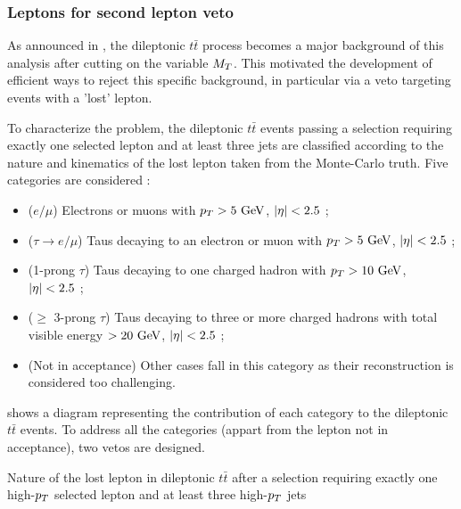         \subsubsection{Leptons for second lepton veto \label{sec:vetoLeptons}}

    As announced in , the dileptonic $t\bar{t}$
    process becomes a major background of this analysis after cutting on the variable $M_T$.
    This motivated the development of efficient ways to reject this specific background,
    in particular via a veto targeting events with a 'lost' lepton.

    To characterize the problem, the dileptonic $t\bar{t}$ events passing a selection
    requiring exactly one selected lepton and at least three jets are classified according
    to the nature and kinematics of the lost lepton taken from the Monte-Carlo truth. Five
    categories are considered :
    \begin{itemize}
        \item ($e/\mu$) Electrons or muons with $p_T > 5~\text{GeV}$, $\left| \eta \right| < 2.5$ ;
        \item ($\tau \rightarrow e/\mu$) Taus decaying to an electron or muon with $p_T > 5~\text{GeV}$, $\left| \eta \right| < 2.5$ ;
        \item (1-prong $\tau$) Taus decaying to one charged hadron with $p_T > 10~\text{GeV}$, $\left| \eta \right| < 2.5$ ;
        \item ($\geq$ 3-prong $\tau$) Taus decaying to three or more charged hadrons
              with total visible energy $> 20~\text{GeV}$, $\left| \eta \right| < 2.5$ ;
        \item (Not in acceptance) Other cases fall in this category as their reconstruction
              is considered too challenging.
    \end{itemize}

     shows a diagram representing
    the contribution of each category to the dileptonic $t\bar{t}$ events. To address all
    the categories (appart from the lepton not in acceptance), two vetos are designed.

                 {Nature of the lost lepton in dileptonic $t\bar{t}$ after a selection
                 requiring exactly one high-$p_T$ selected lepton and at least three
                 high-$p_T$ jets}

